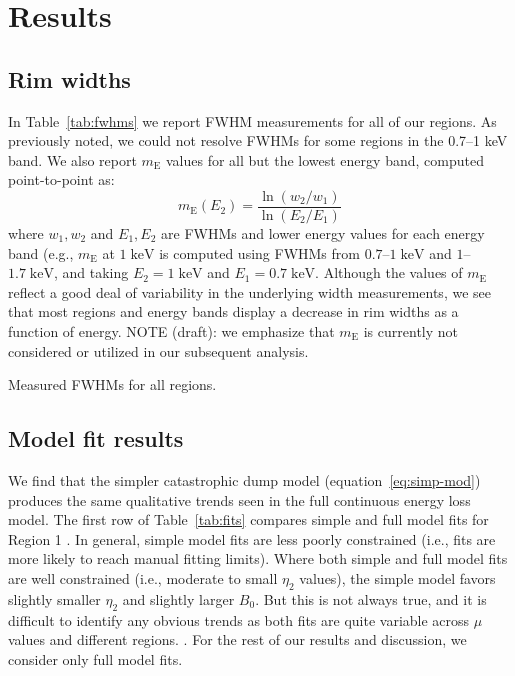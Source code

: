 \documentclass[iop, apj, numberedappendix, twocolappendix]{emulateapj}
\newcommand*{\mt}{\mathrm}
\newcommand*{\unit}[1]{\;\mt{#1}}  %
\newcommand*{\mE}{m_\mt{E}}
\begin{document}
\section{Results}

\subsection{Rim widths}
\label{sec:fwhm-results}

In Table~\ref{tab:fwhms} we report FWHM measurements for all of our regions.
As previously noted, we could not resolve FWHMs for some regions in the 0.7--1
keV band.  We also report $\mE$ values for all but the lowest energy band,
computed point-to-point as: \begin{equation} \mE(E_2) =
\frac{\ln(w_2/w_1)}{\ln(E_2/E_1)} \end{equation} where $w_1, w_2$ and $E_1,
E_2$ are FWHMs and lower energy values for each energy band (e.g., $\mE$ at $1
\unit{keV}$ is computed using FWHMs from $0.7$--$1 \unit{keV}$ and $1$--$1.7
\unit{keV}$, and taking $E_2 = 1 \unit{keV}$ and $E_1 = 0.7 \unit{keV}$.
Although the values of $\mE$ reflect a good deal of variability in the
underlying width measurements, we see that most regions and energy bands
display a decrease in rim widths as a function of energy.  NOTE (draft): we
emphasize that $\mE$ is currently not considered or utilized in our subsequent
analysis.

\begin{table*}[ht]
    \tiny
    \centering
    \caption{Measured FWHMs for all regions.\label{tab:fwhms}}
    
\end{table*}

\subsection{Model fit results}
\label{sec:fit-results}

We find that the simpler catastrophic dump model (equation~\eqref{eq:simp-mod})
produces the same qualitative trends seen in the full continuous energy loss
model.  The first row of Table~\ref{tab:fits} compares simple and full model
fits for Region 1 .  In general, simple model
fits are less poorly constrained (i.e., fits are more likely to reach manual
fitting limits).  Where both simple and full model fits are well constrained
(i.e., moderate to small $\eta_2$ values), the simple model favors slightly
smaller $\eta_2$ and slightly larger $B_0$.  But this is not always true, and
it is difficult to identify any obvious trends as both fits are quite variable
across $\mu$ values and different regions.  .
For the rest of our results and discussion, we consider only full model fits.
\end{document}
